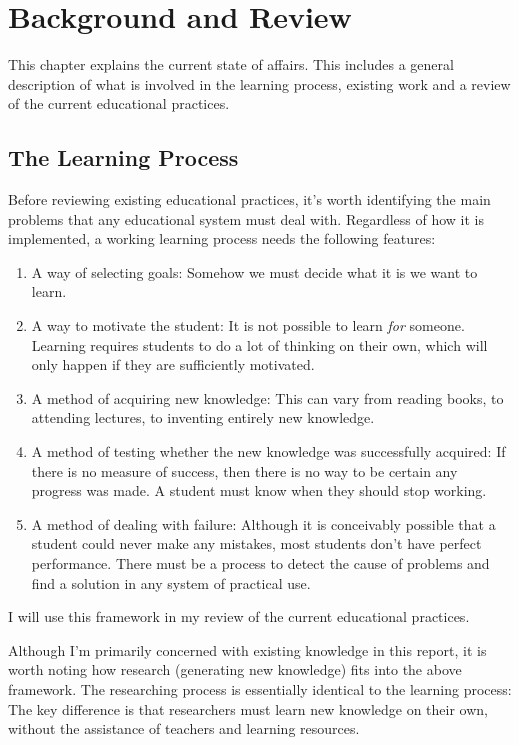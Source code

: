 \chapter{Background and Review}
\label{chapter:background}
  This chapter explains the current state of affairs. This includes a general description of what is involved in the learning process, existing work and a review of the current educational practices.

  \section{The Learning Process}
    \label{section:learning_process}
    Before reviewing existing educational practices, it's worth identifying the main problems that any educational system must deal with. Regardless of how it is implemented, a working learning process needs the following features:

    \begin{enumerate}
      \item A way of selecting goals: Somehow we must decide what it is we want to learn.

      \item A way to motivate the student: It is not possible to learn \emph{for} someone. Learning requires students to do a lot of thinking on their own, which will only happen if they are sufficiently motivated.

      \item A method of acquiring new knowledge: This can vary from reading books, to attending lectures, to inventing entirely new knowledge.

      \item A method of testing whether the new knowledge was successfully acquired: If there is no measure of success, then there is no way to be certain any progress was made. A student must know when they should stop working.

      \item A method of dealing with failure: Although it is conceivably possible that a student could never make any mistakes, most students don't have perfect performance. There must be a process to detect the cause of problems and find a solution in any system of practical use.
    \end{enumerate}

    I will use this framework in my review of the current educational practices.

    Although I'm primarily concerned with existing knowledge in this report, it is worth noting how research (generating new knowledge) fits into the above framework. The researching process is essentially identical to the learning process: The key difference is that researchers must learn new knowledge on their own, without the assistance of teachers and learning resources.

